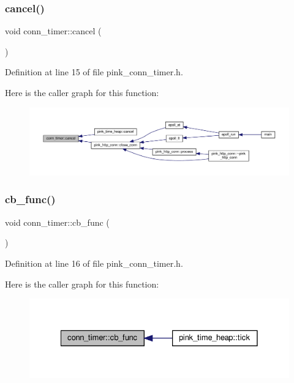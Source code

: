\subsubsection{\texorpdfstring{cancel()}{cancel()}}
{\footnotesize\ttfamily void conn\+\_\+timer\+::cancel (\begin{DoxyParamCaption}{ }\end{DoxyParamCaption})\hspace{0.3cm}{\ttfamily [inline]}}



Definition at line 15 of file pink\+\_\+conn\+\_\+timer.\+h.

Here is the caller graph for this function\+:
\nopagebreak
\begin{figure}[H]
\begin{center}
\leavevmode
\includegraphics[width=350pt]{classconn__timer_a543102358beb1bc590006310556182de_icgraph}
\end{center}
\end{figure}
\mbox{\label{classconn__timer_a86d7a0d33b7423368bba281a0d0eaab9}} 
\subsubsection{\texorpdfstring{cb\+\_\+func()}{cb\_func()}}
{\footnotesize\ttfamily void conn\+\_\+timer\+::cb\+\_\+func (\begin{DoxyParamCaption}{ }\end{DoxyParamCaption})\hspace{0.3cm}{\ttfamily [inline]}}



Definition at line 16 of file pink\+\_\+conn\+\_\+timer.\+h.

Here is the caller graph for this function\+:
\nopagebreak
\begin{figure}[H]
\begin{center}
\leavevmode
\includegraphics[width=328pt]{classconn__timer_a86d7a0d33b7423368bba281a0d0eaab9_icgraph}
\end{center}
\end{figure}
\mbox{\label{classconn__timer_a6cb5ef510c4022acd31b002e15758d60}} 
